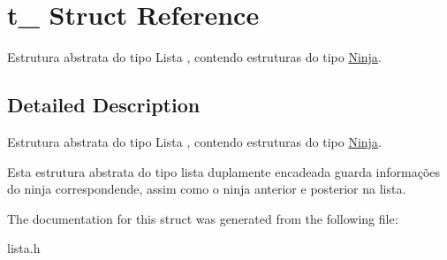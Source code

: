\hypertarget{structt__}{}\section{t\+\_\+ Struct Reference}
\label{structt__}


Estrutura abstrata do tipo Lista , contendo estruturas do tipo \mbox{\hyperlink{structNinja}{Ninja}}.  




\subsection{Detailed Description}
Estrutura abstrata do tipo Lista , contendo estruturas do tipo \mbox{\hyperlink{structNinja}{Ninja}}. 

Esta estrutura abstrata do tipo lista duplamente encadeada guarda informações do ninja correspondende, assim como o ninja anterior e posterior na lista. 

The documentation for this struct was generated from the following file\+:\begin{DoxyCompactItemize}
\item 
lista.\+h\end{DoxyCompactItemize}
